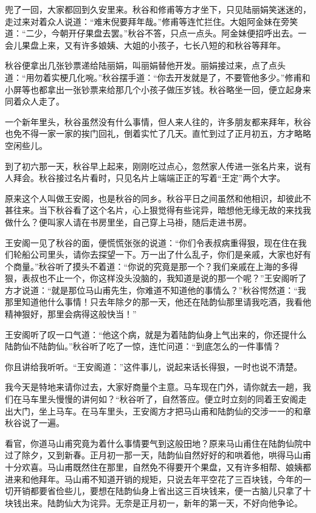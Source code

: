 \documentclass[12pt,UTF8]{ctexbook}
\begin{document}
{{{兜了一回，大家都回到久安里来。秋谷和修甫等方才坐下，只见陆丽娟笑迷迷的，走过来对着众人说道：“难末倪要拜年哉。”修甫等连忙拦住。大姐阿金妹在旁笑道：“二少，今朝开仔果盘去罢。”秋谷不答，只点一点头。阿金妹便招呼出去。一会儿果盘上来，又有许多娘姨、大姐的小孩子，七长八短的和秋谷等拜年。

秋谷便拿出几张钞票递给陆丽娟，叫丽娟替他开发。丽娟接过来，点了点头道：“用勿着实梗几化啘。”秋谷摆手道：“你去开发就是了，不要管他多少。”修甫和小屏等也都拿出一张钞票来给那几个小孩子做压岁钱。秋谷略坐一回，便立起身来同着众人走了。

一个新年里头，秋谷虽然没有什么事情，但人来人往的，许多朋友都来拜年，秋谷也免不得一家一家的挨门回礼，倒着实忙了几天。直忙到过了正月初五，方才略略空闲些儿。

到了初六那一天，秋谷早上起来，刚刚吃过点心，忽然家人传进一张名片来，说有人拜会。秋谷接过名片看时，只见名片上端端正正的写着“王定”两个大字。

原来这个人叫做王安阁，也是秋谷的同乡。秋谷平日之间虽然和他相识，却彼此不甚往来。当下秋谷看了这个名片，心上狠觉得有些诧异，暗想他无缘无故的来找我做什么？便叫家人请在书房里坐，自己穿上马褂，随后走进书房。

王安阁一见了秋谷的面，便慌慌张张的说道：“你们令表叔病重得狠，现在住在我们轮船公司里头，请你去探望一下。万一出了什么乱子，你们是亲戚，大家也好有个商量。”秋谷听了摸头不着道：“你说的究竟是那一个？我们亲戚在上海的多得狠，表叔也不止一个，你这样没头没脑的，我知道是说的那一个呢？”王安阁听了方才说道：“就是那位马山甫先生，你难道不知道他的事情么？”秋谷愕然道：“我那里知道他什么事情！只去年除夕的那一天，他还在陆韵仙那里请我吃酒，我看他精神狠好，那里会病得这般快当！”

王安阁听了叹一口气道：“他这个病，就是为着陆韵仙身上气出来的，你还提什么陆韵仙不陆韵仙。”秋谷听了吃了一惊，连忙问道：“到底怎么的一件事情？

你且讲给我听听。“王安阁道：”这件事儿，说起来话长得狠，一时也说不清楚。

我今天是特地来请你过去，大家好商量个主意。马车现在门外，请你就去一趟，我们在马车里头慢慢的讲何如？“秋谷听了，自然答应。便立时立刻的同着王安阁走出大门，坐上马车。在马车里头，王安阁方才把马山甫和陆韵仙的交涉一一的和章秋谷说了一遍。

看官，你道马山甫究竟为着什么事情要气到这般田地？原来马山甫住在陆韵仙院中过了除夕，又到新春。正月初一那一天，陆韵仙自然好好的和哄着他，哄得马山甫十分欢喜。马山甫既然住在那里，自然免不得要开个果盘，又有许多相帮、娘姨都进来和他拜年。马山甫不知道开销的规矩，只说去年平空花了三百块钱，今年的一切开销都要省俭些儿，要想在陆韵仙身上省出这三百块钱来，便一古脑儿只拿了十块钱出来。陆韵仙大为诧异。无奈是正月初一，新年的第一天，不好向他争论。

}}}
\end{document}
